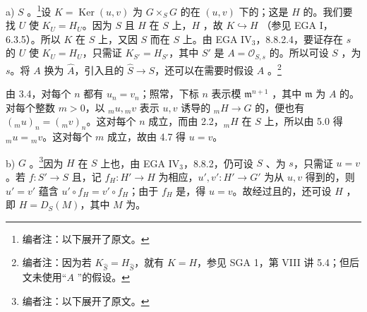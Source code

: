 a) $S$ 。\footnote{编者注：以下展开了原文。}设 $K=\operatorname{Ker}(u,v)$ 为 $G\times_S G$ 的在 $(u,v)$ 下的；这是 $H$ 的。我们要找 $U$ 使 $K_U=H_U$。因为 $S$ 且 $H$ 在 $S$ 上，$H$ ，故 $K\hookrightarrow H$
（参见 EGA I，6.3.5）。所以 $K$ 在 $S$ 上，又因 $S$ 而在 $S$ 上。由 EGA IV$_3$，8.8.2.4，要证存在 $s$ 的 $U$ 使 $K_U=H_U$，只需证 $K_{S'}=H_{S'}$，其中 $S'$ 是 $A=\mathcal O_{S,s}$ 的。所以可设 $S$ ，为 $s$。将 $A$ 换为 $\widehat A$，引入且的 $\widehat S\to S$，还可以在需要时假设 $A$ 。\footnote{编者注：因为若 $K_{\widehat S}=H_{\widehat S}$，就有 $K=H$，参见 SGA 1，第 VIII 讲 5.4；但后文未使用“$A$ ”的假设。}

由 3.4，对每个 $n$ 都有 $u_n=v_n$；照常，下标 $n$ 表示模 $\mathfrak m^{n+1}$ ，其中 $\mathfrak m$ 为 $A$ 的。对每个整数 $m>0$，以 ${}_mu,{}_mv$ 表示 $u,v$ 诱导的 ${}_mH\to G$ 的，便也有 $({}_mu)_n=({}_mv)_n$。这对每个 $n$ 成立，而由 2.2，${}_mH$ 在 $S$ 上，所以由 5.0 得 ${}_mu={}_mv$。这对每个 $m$ 成立，故由 4.7 得 $u=v$。

b) $G$ 。\footnote{编者注：以下展开了原文。}因为 $H$ 在 $S$ 上也，由 EGA IV$_3$，8.8.2，仍可设 $S$ 、为 $s$，只需证 $u=v$。若 $f:S'\to S$ 且，记 $f_H:H'\to H$ 为相应，$u',v':H'\to G'$ 为从 $u,v$ 得到的，则 $u'=v'$ 蕴含 $u'\circ f_H=v'\circ f_H$；由于 $f_H$ 是，得 $u=v$。故经过且的，还可设 $H$ ，即 $H=D_S(M)$，其中 $M$ 为。


